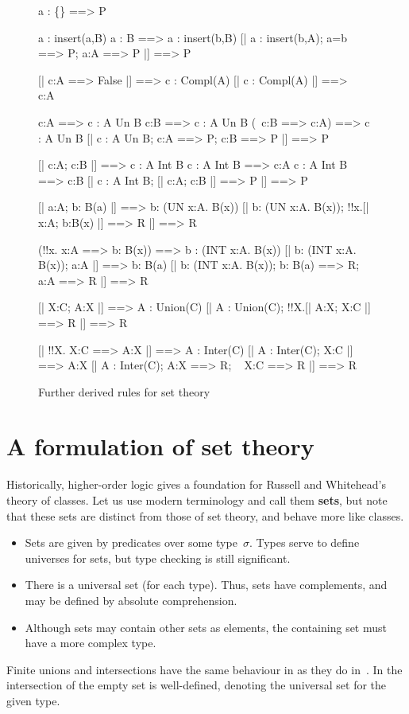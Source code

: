 \begin{figure} \makeatother
\begin{ttbox}
   a : \{\} ==> P

 a : insert(a,B)
 a : B ==> a : insert(b,B)
  [| a : insert(b,A);  a=b ==> P;  a:A ==> P |] ==> P

   [| c:A ==> False |] ==> c : Compl(A)
   [| c : Compl(A) |] ==> ~ c:A

     c:A ==> c : A Un B
     c:B ==> c : A Un B
     (~c:B ==> c:A) ==> c : A Un B
      [| c : A Un B;  c:A ==> P;  c:B ==> P |] ==> P

     [| c:A;  c:B |] ==> c : A Int B
    c : A Int B ==> c:A
    c : A Int B ==> c:B
     [| c : A Int B;  [| c:A; c:B |] ==> P |] ==> P

     [| a:A;  b: B(a) |] ==> b: (UN x:A. B(x))
     [| b: (UN x:A. B(x));  !!x.[| x:A;  b:B(x) |] ==> R |] ==> R

    (!!x. x:A ==> b: B(x)) ==> b : (INT x:A. B(x))
    [| b: (INT x:A. B(x));  a:A |] ==> b: B(a)
    [| b: (INT x:A. B(x));  b: B(a) ==> R;  ~ a:A ==> R |] ==> R

   [| X:C;  A:X |] ==> A : Union(C)
   [| A : Union(C);  !!X.[| A:X;  X:C |] ==> R |] ==> R

   [| !!X. X:C ==> A:X |] ==> A : Inter(C)
   [| A : Inter(C);  X:C |] ==> A:X
   [| A : Inter(C);  A:X ==> R;  ~ X:C ==> R |] ==> R
\end{ttbox}
\caption{Further derived rules for set theory} \label{hol-set2}
\end{figure}


\section{A formulation of set theory}
Historically, higher-order logic gives a foundation for Russell and
Whitehead's theory of classes.  Let us use modern terminology and call them
{\bf sets}, but note that these sets are distinct from those of {\ZF} set
theory, and behave more like {\ZF} classes.
\begin{itemize}
\item
Sets are given by predicates over some type~$\sigma$.  Types serve to
define universes for sets, but type checking is still significant.
\item
There is a universal set (for each type).  Thus, sets have complements, and
may be defined by absolute comprehension.
\item
Although sets may contain other sets as elements, the containing set must
have a more complex type.
\end{itemize}
Finite unions and intersections have the same behaviour in {\HOL} as they
do in~{\ZF}.  In {\HOL} the intersection of the empty set is well-defined,
denoting the universal set for the given type.

